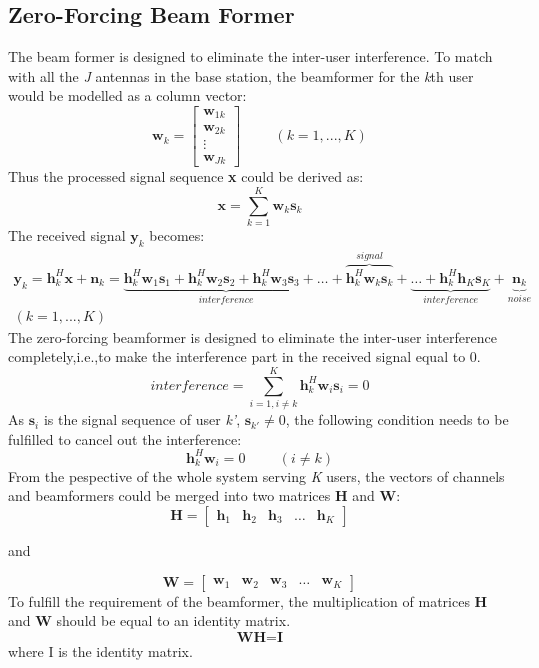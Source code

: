 \documentclass{article}
\begin{document}
\subsection{Zero-Forcing Beam Former}
The beam former is designed to eliminate the inter-user interference.
To match with all the \textit{J} antennas in the base station,
the beamformer for the \textit{k}th user would be modelled as a column vector:
\[
\textbf{w}_k
=
\begin{bmatrix}
    \textbf{w}_{1k} \\
    \textbf{w}_{2k} \\
    \vdots \\
    \textbf{w}_{Jk}
\end{bmatrix} \hspace{1cm}(k = 1,...,K)
\]
Thus the processed signal sequence \textbf{x} could be derived as:
\[
\textbf{x} = \sum_{k=1}^{K}\textbf{w}_k\textbf{s}_k
\]
The received signal $\textbf{y}_k$ becomes:
\[
\begin{split}
\textbf{y}_k = \textbf{h}_k^H\textbf{x}+\textbf{n}_k = \underbrace{
\textbf{h}_k^H\textbf{w}_1\textbf{s}_1 +\textbf{h}_k^H\textbf{w}_2\textbf{s}_2+\textbf{h}_k^H\textbf{w}_3\textbf{s}_3
+\dots}_{interference}+\overbrace{\textbf{h}_k^H\textbf{w}_k\textbf{s}_k}^{signal}+
\underbrace{\dots+\textbf{h}_k^H\textbf{h}_K\textbf{s}_K}_{interference} +\underbrace{\textbf{n}_k}_{noise} \\
(k = 1,...,K)
\end{split}
\]
The zero-forcing beamformer is designed to eliminate the inter-user interference completely,i.e.,to make the interference part in the received signal equal to 0.
\[
\textit{interference} = \sum_{i = 1,i\neq k}^{K}\textbf{h}_k^H\textbf{w}_{i}\textbf{s}_{i} = 0
\]
As $\textbf{s}_{i}$ is the signal sequence of user \textit{k'}, $\textbf{s}_{k'} \neq 0$, the following condition needs to be fulfilled to cancel out the interference:
\[
\textbf{h}_k^H\textbf{w}_{i} = 0 \hspace{1cm}(i \neq k)
\]
From the pespective of the whole system serving \textit{K} users, the vectors of channels and beamformers could be merged into
two matrices \textbf{H} and \textbf{W}:
\[
\textbf{H}
=
\begin{bmatrix}
    \textbf{h}_{1} & \textbf{h}_{2} & \textbf{h}_{3} & \dots  & \textbf{h}_{K}
\end{bmatrix}
\]
\begin{center}
and
\end{center}
\[
\textbf{W}
=
\begin{bmatrix}
    \textbf{w}_{1} & \textbf{w}_{2} & \textbf{w}_{3} & \dots  & \textbf{w}_{K}
\end{bmatrix}
\]
To fulfill the requirement of the beamformer, the multiplication of matrices \textbf{H} and \textbf{W} should be equal to an identity matrix.
\[
\textbf{WH} = \textbf{I}
\]
where I is the identity matrix.
\end{document}
